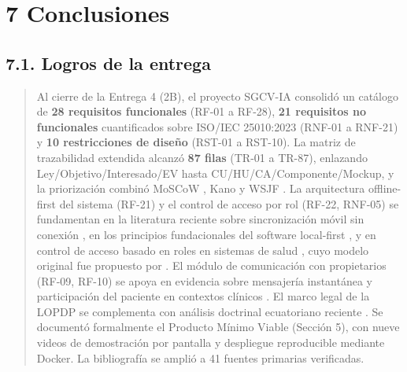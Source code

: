 \documentclass[
]{article}
\begin{document}
\section{7 Conclusiones}\label{conclusiones}

\subsection{7.1. Logros de la entrega}\label{s7-1-logros-de-la-entrega}
\begin{quote}
Al cierre de la Entrega 4 (2B), el proyecto SGCV-IA consolidó un
catálogo de \textbf{28 requisitos funcionales} (RF-01 a RF-28),
\textbf{21 requisitos no funcionales} cuantificados sobre ISO/IEC
25010:2023 (RNF-01 a RNF-21) y \textbf{10 restricciones de diseño}
(RST-01 a RST-10). La matriz de trazabilidad extendida alcanzó
\textbf{87 filas} (TR-01 a TR-87), enlazando Ley/Objetivo/Interesado/EV
hasta CU/HU/CA/Componente/Mockup, y la priorización combinó MoSCoW
\cite{vijayakumar2024}, Kano \cite{binder2023} y WSJF
\cite{reinertsen2009,leffingwell2016}. La arquitectura offline-first
del sistema (RF-21) y el control de acceso por rol (RF-22, RNF-05) se
fundamentan en la literatura reciente sobre sincronización móvil sin
conexión \cite{ningrum2026}, en los principios fundacionales del
software local-first \cite{kleppmann2019}, y en control de acceso
basado en roles en sistemas de salud \cite{carvalho2018}, cuyo modelo
original fue propuesto por \cite{ferraiolo1992}. El módulo de comunicación con
propietarios (RF-09, RF-10) se apoya en evidencia sobre mensajería
instantánea y participación del paciente en contextos clínicos
\cite{manurung2026,blasiak2022}. El marco legal de la LOPDP se
complementa con análisis doctrinal ecuatoriano reciente
\cite{rovira2023,zambrano2023}. Se documentó formalmente el
Producto Mínimo Viable (Sección 5), con nueve videos de demostración
por pantalla y despliegue reproducible mediante Docker. La bibliografía
se amplió a 41 fuentes primarias verificadas.
\end{quote}
\end{document}
